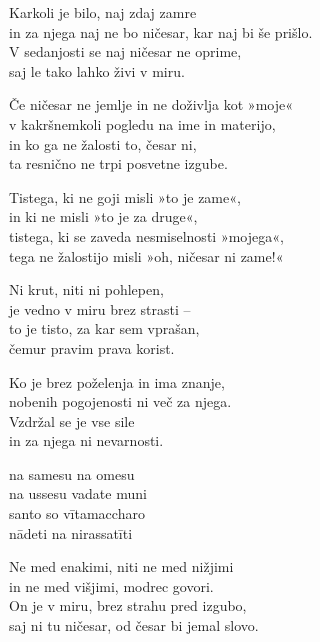 
\clearpage

Karkoli je bilo, naj zdaj zamre\\
in za njega naj ne bo ničesar, kar naj bi še prišlo.\\
V sedanjosti se naj ničesar ne oprime,\\
saj le tako lahko živi v miru.

Če ničesar ne jemlje in ne doživlja kot »moje«\\
v kakršnemkoli pogledu na ime in materijo,\\
in ko ga ne žalosti to, česar ni,\\
ta resnično ne trpi posvetne izgube.

Tistega, ki ne goji misli »to je zame«,\\
in ki ne misli »to je za druge«,\\
tistega, ki se zaveda nesmiselnosti »mojega«,\\
tega ne žalostijo misli »oh, ničesar ni zame!«

Ni krut, niti ni pohlepen,\\
je vedno v miru brez strasti --\\
to je tisto, za kar sem vprašan,\\
čemur pravim prava korist.

Ko je brez poželenja in ima znanje,\\
nobenih pogojenosti ni več za njega.\\
Vzdržal se je vse sile\\
in za njega ni nevarnosti.


\clearpage

na samesu na omesu\\
na ussesu vadate muni\\
santo so vītamaccharo\\
nādeti na nirassatīti


\clearpage

Ne med enakimi, niti ne med nižjimi\\
in ne med višjimi, modrec govori.\\
On je v miru, brez strahu pred izgubo,\\
saj ni tu ničesar, od česar bi jemal slovo.

